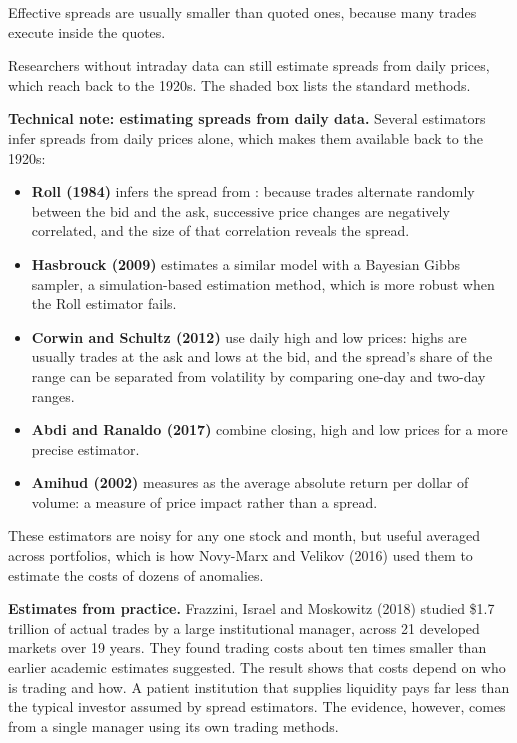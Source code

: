 Effective spreads are usually smaller than quoted ones, because many trades execute inside the quotes.

Researchers without intraday data can still estimate spreads from daily prices, which reach back to the 1920s. The shaded box lists the standard methods.

\begin{technote}
\textbf{Technical note: estimating spreads from daily data.} Several estimators infer spreads from daily prices alone, which makes them available back to the 1920s:

\begin{itemize}
  \item \textbf{Roll (1984)} infers the spread from : because trades alternate randomly between the bid and the ask, successive price changes are negatively correlated, and the size of that correlation reveals the spread.
  \item \textbf{Hasbrouck (2009)} estimates a similar model with a Bayesian Gibbs sampler, a simulation-based estimation method, which is more robust when the Roll estimator fails.
  \item \textbf{Corwin and Schultz (2012)} use daily high and low prices: highs are usually trades at the ask and lows at the bid, and the spread's share of the range can be separated from volatility by comparing one-day and two-day ranges.
  \item \textbf{Abdi and Ranaldo (2017)} combine closing, high and low prices for a more precise estimator.
  \item \textbf{Amihud (2002)} measures  as the average absolute return per dollar of volume: a measure of price impact rather than a spread.
\end{itemize}

These estimators are noisy for any one stock and month, but useful averaged across portfolios, which is how Novy-Marx and Velikov (2016) used them to estimate the costs of dozens of anomalies.
\end{technote}

\textbf{Estimates from practice.} Frazzini, Israel and Moskowitz (2018) studied \$1.7 trillion of actual trades by a large institutional manager, across 21 developed markets over 19 years. They found trading costs about ten times smaller than earlier academic estimates suggested. The result shows that costs depend on who is trading and how. A patient institution that supplies liquidity pays far less than the typical investor assumed by spread estimators. The evidence, however, comes from a single manager using its own trading methods.

